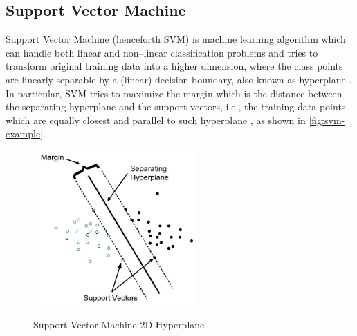 \subsection{Support Vector Machine}

Support Vector Machine (henceforth SVM) is machine learning algorithm which can handle both linear and non--linear classification problems and tries to transform original training data into a higher dimension, where the class points are linearly separable by a (linear) decision boundary, also known as hyperplane \citep{han2011data}.
In particular, SVM tries to maximize the margin which is the distance between the separating hyperplane and the support vectors, i.e., the training data points which are equally closest and parallel to such hyperplane \citep{tatsat2020machine}, as shown in \autoref{fig:svm-example}.

\begin{figure}[H]
    \centering
    \caption{Support Vector Machine 2D Hyperplane}\vspace{0.5em}
    \label{fig:svm-example}\
    \includegraphics[width=60mm]{Figures/svmhyperplane.jpg}

    \vspace{-1em}
\end{figure}

